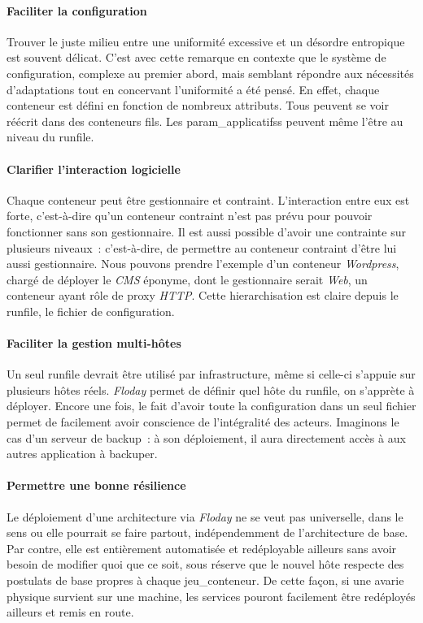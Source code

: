 \paragraph{Faciliter la configuration}
Trouver le juste milieu entre une uniformité excessive et un désordre entropique est souvent délicat.
C'est avec cette remarque en contexte que le système de configuration, complexe au premier abord, mais semblant répondre aux nécessités d'adaptations tout en concervant l'uniformité a été pensé.
En effet, chaque \gls{conteneur} est défini en fonction de nombreux \glspl{attribut}.
Tous peuvent se voir réécrit dans des conteneurs fils.
Les \glspl{param_applicatifs} peuvent même l'être au niveau du \gls{runfile}.

\paragraph{Clarifier l'interaction logicielle}
Chaque \gls{conteneur} peut être \gls{gestionnaire} et \gls{contraint}.
L'interaction entre eux est forte, c'est-à-dire qu'un conteneur contraint n'est pas prévu pour pouvoir fonctionner sans son gestionnaire.
Il est aussi possible d'avoir une contrainte sur plusieurs niveaux~: c'est-à-dire, de permettre au conteneur contraint d'être lui aussi gestionnaire.
Nous pouvons prendre l'exemple d'un conteneur \emph{Wordpress}, chargé de déployer le \emph{CMS} éponyme, dont le gestionnaire serait \emph{Web}, un conteneur ayant rôle de proxy \emph{HTTP}.
Cette hierarchisation est claire depuis le \gls{runfile}, le fichier de configuration.

\paragraph{Faciliter la gestion multi-hôtes}
Un seul \gls{runfile} devrait être utilisé par infrastructure, même si celle-ci s'appuie sur plusieurs hôtes réels.
\emph{Floday} permet de définir quel hôte du runfile, on s'apprète à déployer.
Encore une fois, le fait d'avoir toute la configuration dans un seul fichier permet de facilement avoir conscience de l'intégralité des acteurs.
Imaginons le cas d'un serveur de backup~: à son déploiement, il aura directement accès à aux autres \gls{application} à backuper.

\paragraph{Permettre une bonne résilience}
Le déploiement d'une architecture via \emph{Floday} ne se veut pas universelle, dans le sens ou elle pourrait se faire partout, indépendemment de l'architecture de base.
Par contre, elle est entièrement automatisée et redéployable ailleurs sans avoir besoin de modifier quoi que ce soit, sous réserve que le nouvel hôte respecte des postulats de base propres à chaque \gls{jeu_conteneur}.
De cette façon, si une avarie physique survient sur une machine, les services pouront facilement être redéployés ailleurs et remis en route.
